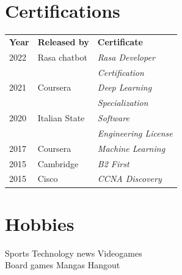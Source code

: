 \documentclass[]{deedy-resume-openfont}
\begin{document}
\begin{minipage}[t]{0.33\textwidth}
\section{Certifications}
\begin{tabular}{@{}lll@{}}
\textbf{Year} & \textbf{Released by} & \textbf{Certificate} \\
2022          & Rasa chatbot  & \textit{Rasa Developer} \\
              &               & \textit{Certification} \\
2021          & Coursera      & \textit{Deep Learning} \\
              &               & \textit{Specialization} \\
2020          & Italian State & \textit{Software}\\
              &               & \textit{Engineering License} \\
2017          & Coursera      & \textit{Machine Learning} \\
2015	      & Cambridge     & \textit{B2 First} \\
2015	      & Cisco         & \textit{CCNA Discovery} \\
\end{tabular}
\sectionsep


\section{Hobbies}
Sports \textbullet{} Technology news \textbullet{} Videogames \\
Board games \textbullet{} Mangas \textbullet{} Hangout

%
%

\end{minipage}
\hfill
\end{document}
